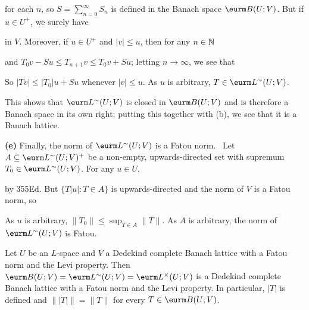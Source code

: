{\noindent for each $n$, so $S=\sum_{n=0}^{\infty}S_n$ is defined in the
Banach space $\eurm B(U;V)$.   But if $u\in U^+$, we surely have


\noindent in $V$.   Moreover, if $u\in U^+$ and $|v|\le u$, then for
any $n\in\Bbb N$


\noindent and $T_0v-Su\le T_{n+1}v\le T_0v+Su$;  letting $n\to\infty$,
we see that


\noindent So $|Tv|\le|T_0|u+Su$ whenever $|v|\le u$.   As
$u$ is arbitrary, $T\in\eurm L^{\sim}(U;V)$.

This shows that $\eurm L^{\sim}(U;V)$ is closed in $\eurm B(U;V)$
and is therefore a Banach space in its own right;  putting this together
with (b), we see that it is a Banach lattice.

\medskip

{\bf (e)} Finally, the norm of $\eurm L^{\sim}(U;V)$ is a Fatou norm.
\Prf\ Let $A\subseteq\eurm L^{\sim}(U;V)^+$ be a non-empty,
upwards-directed set with supremum $T_0\in\eurm L^{\sim}(U;V)$.   For
any $u\in U$,


\noindent by 355Ed.   But $\{T|u|:T\in A\}$ is upwards-directed and
the norm of $V$ is a Fatou norm, so


\noindent As $u$ is arbitrary, $\|T_0\|\le\sup_{T\in A}\|T\|$.   As $A$
is arbitrary, the norm of $\eurm L^{\sim}(U;V)$ is Fatou.  \Qed
}%

 Let $U$ be an $L$-space and $V$ a Dedekind
complete Banach
lattice with a Fatou norm and the Levi property.   Then $\eurm
B(U;V)=\eurm L^{\sim}(U;V)=\eurm L^{\times}(U;V)$ is a Dedekind complete
Banach lattice with a Fatou norm
and the Levi property.   In particular, $|T|$ is defined and
$\||T|\|=\|T\|$ for every $T\in\eurm B(U;V)$.

